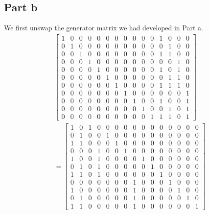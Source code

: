 \documentclass{article}
\begin{document}
\subsection{Part b}
We first unswap the generator matrix we had developed in Part a.
\begin{align*}
    &\begin{bmatrix}
        1 & 0 & 0 & 0 & 0 & 0 & 0 & 0 & 0 & 0 & 0 & 1 & 0 & 0 & 0 \\
        0 & 1 & 0 & 0 & 0 & 0 & 0 & 0 & 0 & 0 & 0 & 0 & 1 & 0 & 0 \\
        0 & 0 & 1 & 0 & 0 & 0 & 0 & 0 & 0 & 0 & 0 & 1 & 1 & 0 & 0 \\
        0 & 0 & 0 & 1 & 0 & 0 & 0 & 0 & 0 & 0 & 0 & 0 & 0 & 1 & 0 \\
        0 & 0 & 0 & 0 & 1 & 0 & 0 & 0 & 0 & 0 & 0 & 1 & 0 & 1 & 0 \\
        0 & 0 & 0 & 0 & 0 & 1 & 0 & 0 & 0 & 0 & 0 & 0 & 1 & 1 & 0 \\
        0 & 0 & 0 & 0 & 0 & 0 & 1 & 0 & 0 & 0 & 0 & 1 & 1 & 1 & 0 \\
        0 & 0 & 0 & 0 & 0 & 0 & 0 & 1 & 0 & 0 & 0 & 0 & 0 & 0 & 1 \\
        0 & 0 & 0 & 0 & 0 & 0 & 0 & 0 & 1 & 0 & 0 & 1 & 0 & 0 & 1 \\
        0 & 0 & 0 & 0 & 0 & 0 & 0 & 0 & 0 & 1 & 0 & 0 & 1 & 0 & 1 \\
        0 & 0 & 0 & 0 & 0 & 0 & 0 & 0 & 0 & 0 & 1 & 1 & 1 & 0 & 1
    \end{bmatrix} \\
    &=
    \begin{bmatrix}
        1 & 0 & 1 & 0 & 0 & 0 & 0 & 0 & 0 & 0 & 0 & 0 & 0 & 0 & 0 \\
        0 & 1 & 0 & 0 & 1 & 0 & 0 & 0 & 0 & 0 & 0 & 0 & 0 & 0 & 0 \\
        1 & 1 & 0 & 0 & 0 & 1 & 0 & 0 & 0 & 0 & 0 & 0 & 0 & 0 & 0 \\
        0 & 0 & 0 & 1 & 0 & 0 & 1 & 0 & 0 & 0 & 0 & 0 & 0 & 0 & 0 \\
        1 & 0 & 0 & 1 & 0 & 0 & 0 & 0 & 1 & 0 & 0 & 0 & 0 & 0 & 0 \\
        0 & 1 & 0 & 1 & 0 & 0 & 0 & 0 & 0 & 1 & 0 & 0 & 0 & 0 & 0 \\
        1 & 1 & 0 & 1 & 0 & 0 & 0 & 0 & 0 & 0 & 1 & 0 & 0 & 0 & 0 \\
        0 & 0 & 0 & 0 & 0 & 0 & 0 & 1 & 0 & 0 & 0 & 1 & 0 & 0 & 0 \\
        1 & 0 & 0 & 0 & 0 & 0 & 0 & 1 & 0 & 0 & 0 & 0 & 1 & 0 & 0 \\
        0 & 1 & 0 & 0 & 0 & 0 & 0 & 1 & 0 & 0 & 0 & 0 & 0 & 1 & 0 \\
        1 & 1 & 0 & 0 & 0 & 0 & 0 & 1 & 0 & 0 & 0 & 0 & 0 & 0 & 1
    \end{bmatrix}
\end{align*}
\end{document}

